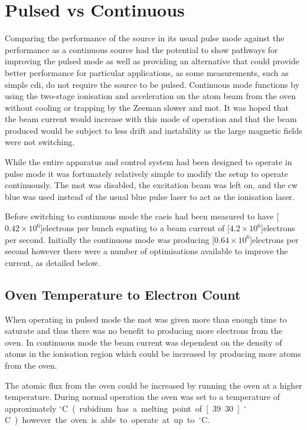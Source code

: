 \section{Pulsed vs Continuous}\label{section:pulse_vs_continuous}
Comparing the performance of the source in its usual pulse mode against the performance as a continuous source had the potential to show pathways for improving the pulsed mode as well as providing an alternative that could provide better performance for particular applications, as some measurements, such as simple \gls{cdi}, do not require the source to be pulsed.
Continuous mode functions by using the two-stage ionisation and acceleration on the atom beam from the oven without cooling or trapping by the Zeeman slower and \gls{mot}.
It was hoped that the beam current would increase with this mode of operation and that the beam produced would be subject to less drift and instability as the large magnetic fields were not switching.

While the entire apparatus and control system had been designed to operate in pulse mode it was fortunately relatively simple to modify the setup to operate continuously.
The \gls{mot} was disabled, the excitation beam was left on, and the \gls{cw} blue was used instead of the usual blue pulse laser to act as the ionisation laser.

Before switching to continuous mode the \gls{caeis} had been measured to have \unit[$0.42\times10^6$]{electrons per bunch} equating to a beam current of \unit[$4.2\times10^6$]{electrons per second}.
Initially the continuous mode was producing \unit[$0.64\times10^6$]{electrons per second} however there were a number of optimisations available to improve the current, as detailed below.

\subsection{Oven Temperature to Electron Count}
When operating in pulsed mode the \gls{mot} was given more than enough time to saturate and thus there was no benefit to producing more electrons from the oven.
In continuous mode the beam current was dependent on the density of atoms in the ionisation region which could be increased by producing more atoms from the oven.

The atomic flux from the oven could be increased by running the oven at a higher temperature.
During normal operation the oven was set to a temperature of approximately \unit[80]{$^\circ$C} (rubidium has a melting point of \unit[39.30]{$^\circ$C}) however the oven is able to operate at up to \unit[200]{$^\circ$C}.

